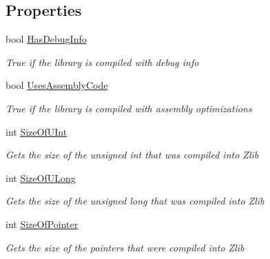 \subsection*{Properties}
\begin{DoxyCompactItemize}
\item 
bool \hyperlink{class_dot_z_lib_1_1_info_ad37fbab0ca0a3b8219d9c59ad7964255}{Has\+Debug\+Info}
\begin{DoxyCompactList}\small\item\em True if the library is compiled with debug info \end{DoxyCompactList}\item 
bool \hyperlink{class_dot_z_lib_1_1_info_a7fa48f081aa54199a54e4c00681c4040}{Uses\+Assembly\+Code}
\begin{DoxyCompactList}\small\item\em True if the library is compiled with assembly optimizations \end{DoxyCompactList}\item 
int \hyperlink{class_dot_z_lib_1_1_info_aea3a993ab00cb3b89aa4c3efc3b3adcb}{Size\+Of\+U\+Int}
\begin{DoxyCompactList}\small\item\em Gets the size of the unsigned int that was compiled into Zlib \end{DoxyCompactList}\item 
int \hyperlink{class_dot_z_lib_1_1_info_a0a6d4a4c79e2b30388a5161f31d9a9ad}{Size\+Of\+U\+Long}
\begin{DoxyCompactList}\small\item\em Gets the size of the unsigned long that was compiled into Zlib \end{DoxyCompactList}\item 
int \hyperlink{class_dot_z_lib_1_1_info_a18ba70edb75d11f7a09d4ae4742f3c2f}{Size\+Of\+Pointer}
\begin{DoxyCompactList}\small\item\em Gets the size of the pointers that were compiled into Zlib \end{DoxyCompactList}\item 

\end{DoxyCompactItemize}

